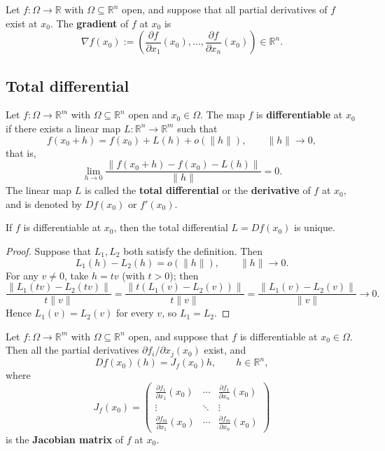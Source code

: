 \begin{definition}[Gradient]\label{def:gradient_ra}
Let $f: \Omega \to \mathbb{R}$ with $\Omega \subseteq \mathbb{R}^n$ open, and suppose that all partial derivatives of $f$ exist at $x_0$. The \textbf{gradient} of $f$ at $x_0$ is
\[
\nabla f(x_0) := \left( \frac{\partial f}{\partial x_1}(x_0), \dots, \frac{\partial f}{\partial x_n}(x_0) \right) \in \mathbb{R}^n.
\]
\end{definition}

\subsection{Total differential}

\begin{definition}\label{def:total_differential_ra}
Let $f: \Omega \to \mathbb{R}^m$ with $\Omega \subseteq \mathbb{R}^n$ open and $x_0 \in \Omega$. The map $f$ is \textbf{differentiable} at $x_0$ if there exists a linear map $L: \mathbb{R}^n \to \mathbb{R}^m$ such that
\[
f(x_0 + h) = f(x_0) + L(h) + o(\|h\|), \qquad \|h\| \to 0,
\]
that is,
\[
\lim_{h \to 0} \frac{\|f(x_0 + h) - f(x_0) - L(h)\|}{\|h\|} = 0.
\]
The linear map $L$ is called the \textbf{total differential} or the \textbf{derivative} of $f$ at $x_0$, and is denoted by $Df(x_0)$ or $f'(x_0)$.
\end{definition}

\begin{proposition}\label{prop:differential_uniqueness}
If $f$ is differentiable at $x_0$, then the total differential $L = Df(x_0)$ is unique.
\end{proposition}

\begin{proof}
Suppose that $L_1, L_2$ both satisfy the definition. Then
\[
L_1(h) - L_2(h) = o(\|h\|), \qquad \|h\| \to 0.
\]
For any $v \neq 0$, take $h = t v$ (with $t > 0$); then
\[
\frac{\|L_1(t v) - L_2(t v)\|}{t \|v\|} = \frac{\|t (L_1(v) - L_2(v))\|}{t \|v\|} = \frac{\|L_1(v) - L_2(v)\|}{\|v\|} \to 0.
\]
Hence $L_1(v) = L_2(v)$ for every $v$, so $L_1 = L_2$.
\end{proof}

\begin{theorem}\label{thm:differentiable_jacobian}
Let $f: \Omega \to \mathbb{R}^m$ with $\Omega \subseteq \mathbb{R}^n$ open, and suppose that $f$ is differentiable at $x_0 \in \Omega$. Then all the partial derivatives $\partial f_i/\partial x_j(x_0)$ exist, and
\[
Df(x_0)(h) = J_f(x_0) h, \qquad h \in \mathbb{R}^n,
\]
where
\[
J_f(x_0) = \begin{pmatrix} \frac{\partial f_1}{\partial x_1}(x_0) & \cdots & \frac{\partial f_1}{\partial x_n}(x_0) \\ \vdots & \ddots & \vdots \\ \frac{\partial f_m}{\partial x_1}(x_0) & \cdots & \frac{\partial f_m}{\partial x_n}(x_0) \end{pmatrix}
\]
is the \textbf{Jacobian matrix} of $f$ at $x_0$.
\end{theorem}

